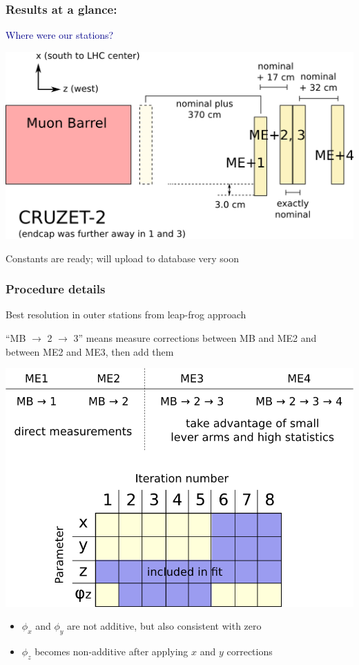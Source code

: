 \documentclass[compress]{beamer}
\begin{document}
\begin{frame}
\frametitle{Results at a glance:}
\vspace{-0.4 cm}
\hspace{-0.83 cm} \textcolor{darkblue}{\Large Where were our stations?}

\vfill
\includegraphics[width=\linewidth]{where_things_are.png}

\vfill
Constants are ready; will upload to database very soon
\end{frame}

\begin{frame}
\frametitle{Procedure details}

Best resolution in outer stations from leap-frog approach

``MB $\to$ 2 $\to$ 3'' means measure corrections between MB and ME2
and between ME2 and ME3, then add them

\begin{center}
\includegraphics[width=0.7\linewidth]{stepping_stones.png}
\end{center}

\begin{itemize}
\item $\phi_x$ and $\phi_y$ are not additive, but also consistent with zero
\item $\phi_z$ becomes non-additive after applying $x$ and $y$ corrections
\end{itemize}
\end{frame}
\end{document}
